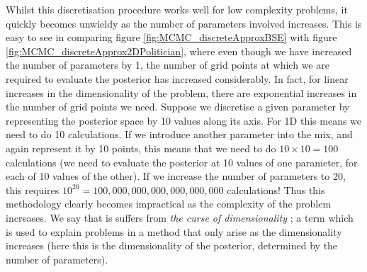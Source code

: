 \documentclass[11pt,fullpage]{book}
\begin{document}
Whilst this discretisation procedure works well for low complexity problems, it quickly becomes unwieldy as the number of parameters involved increases. This is easy to see in comparing figure \ref{fig:MCMC_discreteApproxBSE} with figure \ref{fig:MCMC_discreteApprox2DPolitician}, where even though we have increased the number of parameters by 1, the number of grid points at which we are required to evaluate the posterior has increased considerably. In fact, for linear increases in the dimensionality of the problem, there are exponential increases in the number of grid points we need. Suppose we discretise a given parameter by representing the posterior space by 10 values along its axis. For 1D this means we need to do 10 calculations. If we introduce another parameter into the mix, and again represent it by 10 points, this means that we need to do $10\times 10=100$ calculations (we need to evaluate the posterior at 10 values of one parameter, for each of 10 values of the other). If we increase the number of parameters to 20, this requires $10^{20}=100,000,000,000,000,000,000$ calculations! Thus this methodology clearly becomes impractical as the complexity of the problem increases. We say that is suffers from \textit{the curse of dimensionality} ; a term which is used to explain problems in a method that only arise as the dimensionality increases (here this is the dimensionality of the posterior, determined by the number of parameters).
\end{document}
